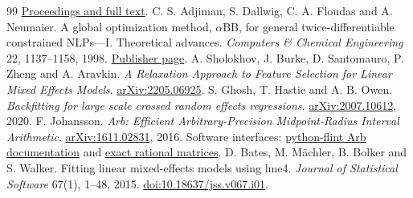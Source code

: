 \documentclass[11pt,a4paper]{article}
\theoremstyle{remark}\newtheorem{remark}[theorem]{Remark}
\begin{document}
\begin{thebibliography}{99}
\href{https://proceedings.mlr.press/v119/atamturk20a.html}{Proceedings and full text}.
 C. S. Adjiman, S. Dallwig, C. A. Floudas and A. Neumaier.
A global optimization method, $\alpha$BB, for general twice-differentiable
constrained NLPs---I. Theoretical advances.
\emph{Computers \& Chemical Engineering} 22, 1137--1158, 1998.
\href{https://www.sciencedirect.com/science/article/pii/S0098135498000271}{Publisher page}.
 A. Sholokhov, J. Burke, D. Santomauro, P. Zheng and A. Aravkin.
\emph{A Relaxation Approach to Feature Selection for Linear Mixed Effects Models}.
\href{https://arxiv.org/abs/2205.06925}{arXiv:2205.06925}.
 S. Ghosh, T. Hastie and A. B. Owen.
\emph{Backfitting for large scale crossed random effects regressions}.
\href{https://arxiv.org/abs/2007.10612}{arXiv:2007.10612}, 2020.
 F. Johansson.
\emph{Arb: Efficient Arbitrary-Precision Midpoint-Radius Interval Arithmetic}.
\href{https://arxiv.org/abs/1611.02831}{arXiv:1611.02831}, 2016.
Software interfaces: \href{https://python-flint.readthedocs.io/en/latest/arb.html}{python-flint Arb documentation}
and \href{https://python-flint.readthedocs.io/en/latest/fmpq_mat.html}{exact rational matrices}.
 D. Bates, M. M\"achler, B. Bolker and S. Walker.
Fitting linear mixed-effects models using lme4.
\emph{Journal of Statistical Software} 67(1), 1--48, 2015.
\href{https://doi.org/10.18637/jss.v067.i01}{doi:10.18637/jss.v067.i01}.
\end{thebibliography}
\end{document}
